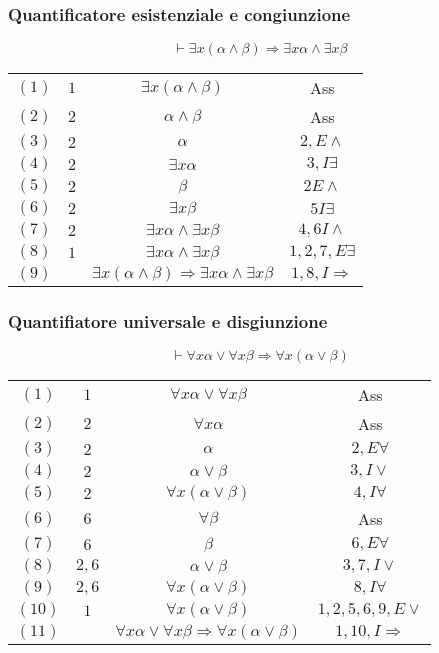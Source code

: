 \subsubsection{Quantificatore esistenziale e congiunzione}
\begin{equation}
\vdash\exists x(\alpha\land\beta)\Rightarrow\exists x\alpha\land\exists x\beta
\end{equation}
\begin{tabular}{c c c c}
$(1)$& $1$ & $\exists x(\alpha\land\beta)$ & Ass\\
$(2)$& $2$ & $\alpha\land\beta$ & Ass\\
$(3)$ & $2$ & $\alpha$& $2, E\land$\\
$(4)$ & $2$ & $\exists x\alpha$ & $3 , I\exists$\\
$(5)$ & $2$ & $\beta$ & $2 E\land$\\
$(6)$ & $2$ & $\exists x\beta$ & $5 I\exists$\\
$(7)$ & $2$ & $\exists x\alpha\land\exists x\beta$ & $4,6 I\land$\\
$(8)$ & $1$ & $\exists x\alpha\land\exists x\beta$ & $1, 2, 7, E\exists$\\
$(9)$ &     & $\exists x(\alpha\land\beta)\Rightarrow\exists x\alpha\land\exists x\beta$ & $1, 8, I\Rightarrow$\\
\end{tabular}
\subsubsection{Quantifiatore universale e disgiunzione}
\begin{equation}
\vdash\forall x\alpha\lor\forall x\beta\Rightarrow\forall x(\alpha\lor\beta)
\end{equation}
\begin{tabular}{c c c c}
$(1)$  & $1$ & $\forall x\alpha\lor\forall x\beta$ & Ass \\
$(2)$  & $2$ & $\forall x\alpha$ & Ass \\
$(3)$  & $2$ & $\alpha$ & $2, E\forall$ \\
$(4)$  & $2$ & $\alpha\lor\beta$ & $3, I\lor$ \\
$(5)$  & $2$ & $\forall x(\alpha\lor\beta)$ & $4, I\forall$ \\
$(6)$  & $6$ & $\forall\beta$ & Ass \\
$(7)$  & $6$ & $\beta$ & $6, E\forall$ \\
$(8)$  & $2, 6$ & $\alpha\lor\beta$ & $3, 7, I\lor$ \\
$(9)$  & $2, 6$ & $\forall x(\alpha\lor\beta)$ & $8, I\forall$ \\
$(10)$ & $1$ & $\forall x(\alpha\lor\beta)$ & $1, 2, 5, 6, 9, E\lor$ \\
$(11)$ &  & $\forall x\alpha\lor\forall x\beta\Rightarrow\forall x(\alpha\lor\beta)$ & $1, 10, I\Rightarrow$ \\
\end{tabular}
